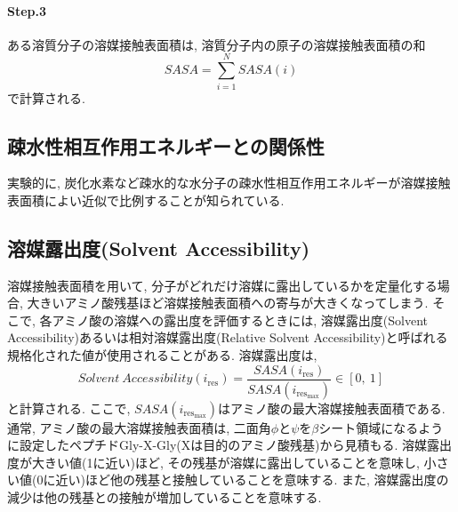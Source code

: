 \paragraph{Step.3} ある溶質分子の溶媒接触表面積は, 溶質分子内の原子の溶媒接触表面積の和
\begin{equation}
    SASA
    =
    \sum_{i=1}^{N} SASA(i)
\end{equation}
で計算される. 

\subsection{疎水性相互作用エネルギーとの関係性}
実験的に, 炭化水素など疎水的な水分子の疎水性相互作用エネルギーが溶媒接触表面積によい近似で比例することが知られている\cite{1970Nozaki, 2010TohHiroyuki}. 

\subsection{溶媒露出度(Solvent Accessibility)}
溶媒接触表面積を用いて, 分子がどれだけ溶媒に露出しているかを定量化する場合, 大きいアミノ酸残基ほど溶媒接触表面積への寄与が大きくなってしまう. 
そこで, 各アミノ酸の溶媒への露出度を評価するときには, 溶媒露出度(Solvent Accessibility)あるいは相対溶媒露出度(Relative Solvent Accessibility)と呼ばれる規格化された値が使用されることがある. 
溶媒露出度は, 
\begin{equation}
    Solvent~Accessibility (i_{\mathrm{res}}) =
    \frac{SASA(i_{\mathrm{res}})}{SASA(i_{\mathrm{res}_{\max}})} \in [0,~1]
\end{equation}
と計算される. 
ここで, $SASA(i_{\mathrm{res}_{\max}})$はアミノ酸の最大溶媒接触表面積である. 
通常, アミノ酸の最大溶媒接触表面積は, 二面角$\phi$と$\psi$を$\beta$シート領域になるように設定したペプチドGly-X-Gly(Xは目的のアミノ酸残基)から見積もる. 
溶媒露出度が大きい値(1に近い)ほど, その残基が溶媒に露出していることを意味し, 小さい値(0に近い)ほど他の残基と接触していることを意味する. 
また, 溶媒露出度の減少は他の残基との接触が増加していることを意味する. 





